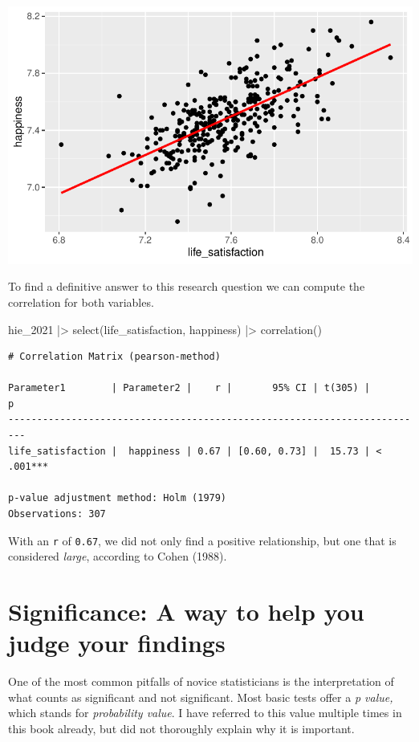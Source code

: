 \documentclass[
  letterpaper,
]{krantz}
\makeatletter
\newenvironment{Shaded}{\begin{snugshade}}{\end{snugshade}}
\newcommand{\FunctionTok}[1]{\textcolor[rgb]{0.28,0.35,0.67}{#1}}
\newcommand{\NormalTok}[1]{\textcolor[rgb]{0.00,0.23,0.31}{#1}}
\newcommand{\SpecialCharTok}[1]{\textcolor[rgb]{0.37,0.37,0.37}{#1}}
\newenvironment{kframe}{%
\medskip{}
\setlength{\fboxsep}{.8em}
 \def\at@end@of@kframe{}%
 \ifinner\ifhmode%
  \def\at@end@of@kframe{\end{minipage}}%
  \begin{minipage}{\columnwidth}%
 \fi\fi%
 \def\FrameCommand##1{\hskip\@totalleftmargin \hskip-\fboxsep
 \colorbox{shadecolor}{##1}\hskip-\fboxsep
     \hskip-\linewidth \hskip-\@totalleftmargin \hskip\columnwidth}%
 \MakeFramed {\advance\hsize-\width
   \@totalleftmargin\z@ \linewidth\hsize
   \@setminipage}}%
 {\par\unskip\endMakeFramed%
 \at@end@of@kframe}
\renewenvironment{Shaded}{\begin{kframe}}{\end{kframe}}
\makeatother
\begin{document}
\includegraphics{10_correlations_files/figure-latex/happiness-vs-life-satisfaction-regression-line-1.pdf}

To find a definitive answer to this research question we can compute the
correlation for both variables.

\begin{Shaded}
\begin{Highlighting}[]
\NormalTok{hie\_2021 }\SpecialCharTok{|\textgreater{}}
  \FunctionTok{select}\NormalTok{(life\_satisfaction, happiness) }\SpecialCharTok{|\textgreater{}}
  \FunctionTok{correlation}\NormalTok{()}
\end{Highlighting}
\end{Shaded}

\begin{verbatim}
# Correlation Matrix (pearson-method)

Parameter1        | Parameter2 |    r |       95% CI | t(305) |         p
-------------------------------------------------------------------------
life_satisfaction |  happiness | 0.67 | [0.60, 0.73] |  15.73 | < .001***

p-value adjustment method: Holm (1979)
Observations: 307
\end{verbatim}

With an \texttt{r} of \texttt{0.67}, we did not only find a positive
relationship, but one that is considered \emph{large}, according to
Cohen (1988).

\section{Significance: A way to help you judge your
findings}\label{sec-significance}

One of the most common pitfalls of novice statisticians is the
interpretation of what counts as significant and not significant. Most
basic tests offer a \emph{p value,} which stands for \emph{probability
value}. I have referred to this value multiple times in this book
already, but did not thoroughly explain why it is important.
\end{document}
